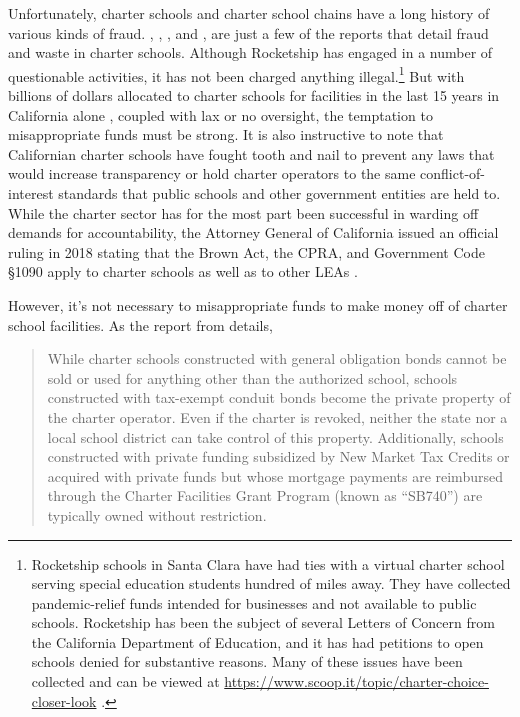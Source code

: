 Unfortunately, charter schools and charter school chains have a long history of various kinds of fraud. \textcite{Lafer2017}, \textcite{ITPT2018}, \textcite{Burris.etal2020}, and \textcite{Burris.Bryant2020}, are just a few of the reports that detail fraud and waste in charter schools. Although Rocketship has engaged in a number of questionable activities, it has not been charged anything illegal.\footnote{Rocketship schools in Santa Clara have had ties with a virtual charter school serving special education students hundred of miles away. They have collected pandemic-relief funds intended for businesses and not available to public schools. Rocketship has been the subject of several Letters of Concern from the California Department of Education, and it has had petitions to open schools denied for substantive reasons. Many of these issues have been collected and can be viewed at \url{https://www.scoop.it/topic/charter-choice-closer-look} \parencite{Marachi2022}.} But with billions of dollars allocated to charter schools for facilities in the last 15 years in California alone \parencite[4]{Lafer2017}, coupled with lax or no oversight, the temptation to misappropriate funds must be strong. It is also instructive to note that Californian charter schools have fought tooth and nail to prevent any laws that would increase transparency or hold charter operators to the same conflict-of-interest standards that public schools and other government entities are held to. While the charter sector has for the most part been successful in warding off demands for accountability, the Attorney General of California issued an official ruling in 2018 stating that the Brown Act, the CPRA, and Government Code §1090 apply to charter schools as well as to other LEAs \parencite{Becerra.Medeiros2018}.

However, it's not necessary to misappropriate funds to make money off of charter school facilities. As the report  from \citeauthor{ITPT2018} details,

\begin{quotation}\noindent\OnehalfSpacing%
While charter schools constructed with general obligation bonds cannot be sold or used for anything other than the authorized school, schools constructed with tax-exempt conduit bonds become the private property of the charter operator. Even if the charter is revoked, neither the state nor a local school district can take control of this property. Additionally, schools constructed with private funding subsidized by New Market Tax Credits or acquired with private funds but whose mortgage payments are reimbursed through the Charter Facilities Grant Program (known as “SB740”) are typically owned without restriction.\\ 
\end{quotation}

